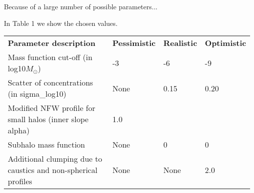 Because of a large number of possible parameters...

In Table 1 we show the chosen values.

\begin{table}
    \begin{tabular}{llll}
    \textbf{Parameter description}                                    & \textbf{Pessimistic} & \textbf{Realistic} & \textbf{Optimistic} \hline \hline \\
    Mass function cut-off (in log10$M_\odot$)        & -3 & -6 & -9 \\
    Scatter of concentrations (in sigma\_log10)              & None & 0.15 & 0.20 \\
    Modified NFW profile for small halos (inner slope alpha) & 1.0 & \cite{Ishiyama_2014} &  \cite{Ishiyama_2014} \\
    Subhalo mass function & None & 0 & 0 \\
    Additional clumping due to caustics and non-spherical profiles & None & None & 2.0
\\    \end{tabular}
\end{table}